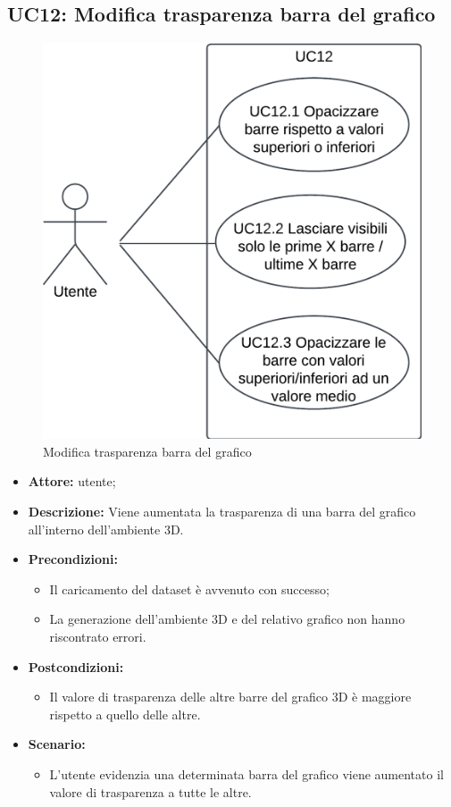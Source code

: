 \subsection{UC12: Modifica trasparenza barra del grafico}
\begin{figure}[h!]\centering
    \includegraphics[scale=0.7]{template/images/UC12.png}
    \caption{Modifica trasparenza barra del grafico}
\end{figure}
\begin{itemize}    
    \item \textbf{Attore:} utente;
    \item \textbf{Descrizione:} Viene aumentata la trasparenza di una barra del grafico all'interno dell'ambiente 3D.
    \item \textbf{Precondizioni:}    
        \begin{itemize}
            \item Il caricamento del dataset è avvenuto con successo;
            \item La generazione dell'ambiente 3D e del relativo grafico non hanno riscontrato errori.
        \end{itemize}    
    \item \textbf{Postcondizioni:}
        \begin{itemize}
            \item Il valore di trasparenza delle altre barre del grafico 3D è maggiore rispetto a quello delle altre.
        \end{itemize}    
    \item \textbf{Scenario:} 
        \begin{itemize}
            \item L'utente evidenzia una determinata barra del grafico viene aumentato il valore di trasparenza a tutte le altre.
        \end{itemize}
\end{itemize}
